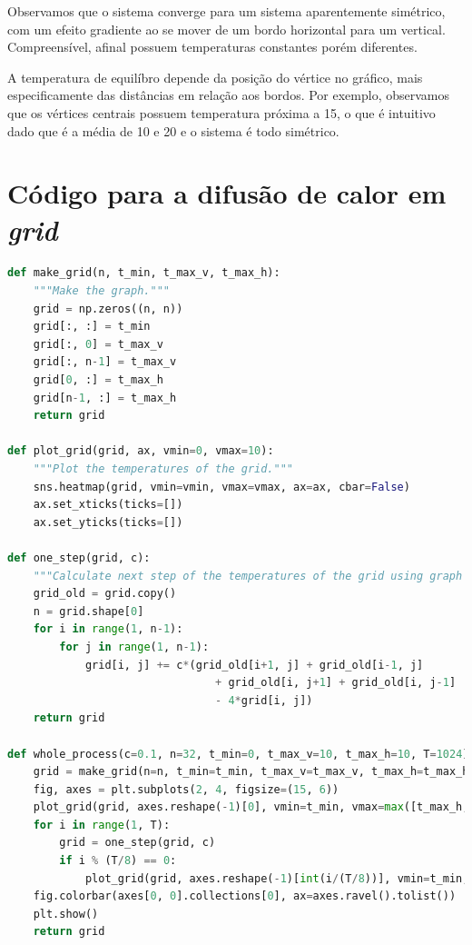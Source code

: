 \documentclass{article}
\begin{document}
\begin{itemize}
                Observamos que o sistema converge para um sistema aparentemente simétrico, com um efeito gradiente ao se mover
                de um bordo horizontal para um vertical. Compreensível, afinal possuem temperaturas constantes porém diferentes.

                A temperatura de equilíbro depende da posição do vértice no gráfico, mais especificamente das distâncias em relação aos bordos.
                Por exemplo, observamos que os vértices centrais possuem temperatura próxima a 15, o que é intuitivo dado que é a média de 10 e 20
                e o sistema é todo simétrico.

        \end{itemize}

    \appendix

    \section{Código para a difusão de calor em \textit{grid}}
        \label{appendix:a}

        \begin{lstlisting}[language=Python]
def make_grid(n, t_min, t_max_v, t_max_h):
    """Make the graph."""
    grid = np.zeros((n, n))
    grid[:, :] = t_min
    grid[:, 0] = t_max_v
    grid[:, n-1] = t_max_v
    grid[0, :] = t_max_h
    grid[n-1, :] = t_max_h
    return grid

def plot_grid(grid, ax, vmin=0, vmax=10):
    """Plot the temperatures of the grid."""
    sns.heatmap(grid, vmin=vmin, vmax=vmax, ax=ax, cbar=False)
    ax.set_xticks(ticks=[])
    ax.set_yticks(ticks=[])

def one_step(grid, c):
    """Calculate next step of the temperatures of the grid using graph diffusion equation."""
    grid_old = grid.copy()
    n = grid.shape[0]
    for i in range(1, n-1):
        for j in range(1, n-1):
            grid[i, j] += c*(grid_old[i+1, j] + grid_old[i-1, j]
                                + grid_old[i, j+1] + grid_old[i, j-1]
                                - 4*grid[i, j])
    return grid

def whole_process(c=0.1, n=32, t_min=0, t_max_v=10, t_max_h=10, T=1024):
    grid = make_grid(n=n, t_min=t_min, t_max_v=t_max_v, t_max_h=t_max_h)
    fig, axes = plt.subplots(2, 4, figsize=(15, 6))
    plot_grid(grid, axes.reshape(-1)[0], vmin=t_min, vmax=max([t_max_h, t_max_v]))
    for i in range(1, T):
        grid = one_step(grid, c)
        if i % (T/8) == 0:
            plot_grid(grid, axes.reshape(-1)[int(i/(T/8))], vmin=t_min, vmax=max([t_max_h, t_max_v]))
    fig.colorbar(axes[0, 0].collections[0], ax=axes.ravel().tolist())
    plt.show()
    return grid
        \end{lstlisting}
\end{document}
